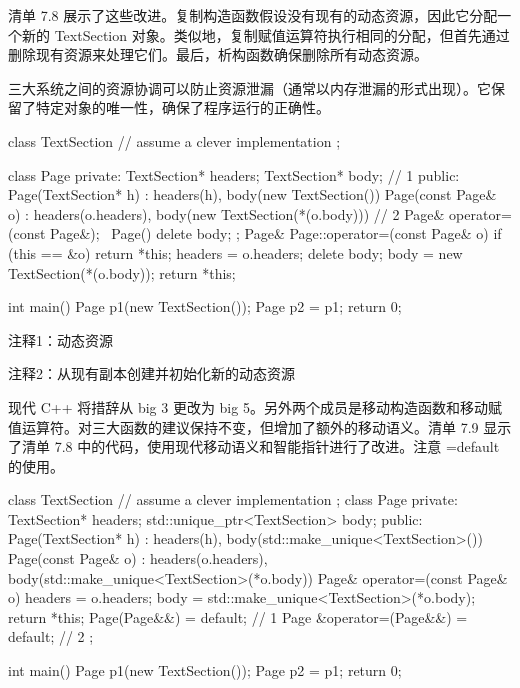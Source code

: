 
清单 7.8 展示了这些改进。复制构造函数假设没有现有的动态资源，因此它分配一个新的 TextSection 对象。类似地，复制赋值运算符执行相同的分配，但首先通过删除现有资源来处理它们。最后，析构函数确保删除所有动态资源。

三大系统之间的资源协调可以防止资源泄漏（通常以内存泄漏的形式出现）。它保留了特定对象的唯一性，确保了程序运行的正确性。


\begin{cpp}
class TextSection {
  // assume a clever implementation
};

class Page {
private:
  TextSection* headers;
  TextSection* body;
// 1
public:
  Page(TextSection* h) : headers(h), body(new TextSection()) {}
  Page(const Page& o) : headers(o.headers), body(new TextSection(*(o.body))) {}
// 2
  Page& operator=(const Page&);
  ~Page() { delete body; }
};
Page& Page::operator=(const Page& o) {
  if (this == &o)
    return *this;
  headers = o.headers;
  delete body;
  body = new TextSection(*(o.body));
  return *this;
}

int main() {
  Page p1(new TextSection());
  Page p2 = p1;
  return 0;
}
\end{cpp}

{\footnotesize
注释1：动态资源

注释2：从现有副本创建并初始化新的动态资源
}

现代 C++ 将措辞从 big 3 更改为 big 5。另外两个成员是移动构造函数和移动赋值运算符。对三大函数的建议保持不变，但增加了额外的移动语义。清单 7.9 显示了清单 7.8 中的代码，使用现代移动语义和智能指针进行了改进。注意 =default 的使用。


\begin{cpp}
class TextSection {
  // assume a clever implementation
};
class Page {
private:
  TextSection* headers;
  std::unique_ptr<TextSection> body;
public:
  Page(TextSection* h) : headers(h),
  body(std::make_unique<TextSection>()) {}
  Page(const Page& o) : headers(o.headers),
  body(std::make_unique<TextSection>(*o.body)) {}
  Page& operator=(const Page& o) {
    headers = o.headers;
    body = std::make_unique<TextSection>(*o.body);
    return *this;
  }
  Page(Page&&) = default; // 1
  Page &operator=(Page&&) = default; // 2
};

int main() {
  Page p1(new TextSection());
  Page p2 = p1;
  return 0;
}
\end{cpp}

